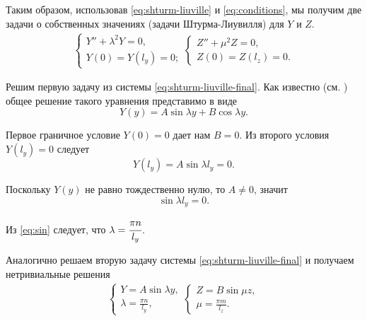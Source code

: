 Таким образом, использовав \eqref{eq:shturm-liuville} и \eqref{eq:conditions}, мы получим две задачи о собственных значениях (задачи Штурма-Лиувилля) для $Y$ и $Z$.
\begin{equation}
  \label{eq:shturm-liuville-final}
  \begin{array}{ll}
    \left\{
      \begin{array}{l}
        Y'' + \lambda^2Y = 0, \\
        Y(0) = Y(l_y) = 0;
      \end{array}
    \right.
    \left\{
      \begin{array}{l}
        Z'' + \mu^2Z = 0, \\
        Z(0) = Z(l_z) = 0.
      \end{array}
    \right.  
  \end{array}
\end{equation}

Решим первую задачу из системы \eqref{eq:shturm-liuville-final}. Как известно (см. \cite{samarsky}) общее решение такого уравнения представимо в виде
\begin{equation}
  \label{eq:common-solution}
  Y(y) = A\sin{\lambda y} + B\cos{\lambda y}.
\end{equation}

Первое граничное условие $Y(0) = 0$ дает нам $B = 0$. Из второго условия $Y(l_y) = 0$ следует 
\[
Y(l_y) = A\sin{\lambda l_y} = 0.
\]

Поскольку $Y(y)$ не равно тождественно нулю, то $A \ne 0$, значит
\begin{equation}
  \label{eq:sin}
  \sin{\lambda l_y} = 0.
\end{equation}

Из \eqref{eq:sin} следует, что $\lambda = \cfrac{\pi n}{l_y}$.

Аналогично решаем вторую задачу системы \eqref{eq:shturm-liuville-final} и получаем нетривиальные решения
\begin{equation}
  \label{func:eigen}
  \begin{array}{ll}
    \left\{
      \begin{array}{l}
        Y = A\sin\lambda y, \\
        \lambda = \frac{\pi n}{l_y},
      \end{array}
    \right.
    \left\{
      \begin{array}{l}
        Z = B\sin\mu z, \\
        \mu = \frac{\pi m}{l_z}.
      \end{array}
    \right.  
  \end{array}
\end{equation}


